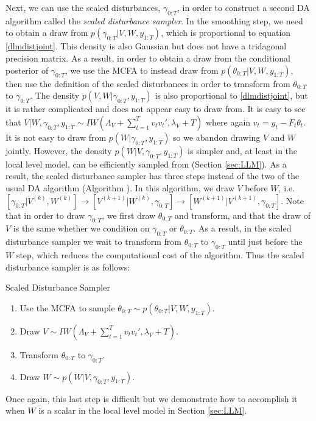 \documentclass{article}
\begin{document}
Next, we can use the scaled disturbances, $\gamma_{0:T}$, in order to construct a second DA algorithm called the {\it scaled disturbance sampler}. In the smoothing step, we need to obtain a draw from $p(\gamma_{0:T}|V,W,y_{1:T})$, which is proportional to equation \eqref{dlmdistjoint}. This density is also Gaussian but does not have a tridagonal precision matrix. As a result, in order to obtain a draw from the conditional posterior of $\gamma_{0:T}$, we use the MCFA to instead draw from $p(\theta_{0:T}|V,W,y_{1:T})$, then use the definition of the scaled disturbances in order to transform from $\theta_{0:T}$ to $\gamma_{0:T}$. The density $p(V,W|\gamma_{0:T},y_{1:T})$ is also proportional to \eqref{dlmdistjoint}, but it is rather complicated and does not appear easy to draw from. It is easy to see that $V|W,\gamma_{0:T},y_{1:T} \sim IW\left(\Lambda_V + \sum_{t=1}^Tv_tv_t',\lambda_V + T\right)$ where again $v_t = y_t - F_t\theta_t$. It is not easy to draw from $p(W|\gamma_{0:T},y_{1:T})$ so we abandon drawing $V$ and $W$ jointly. However, the density $p(W|V,\gamma_{0:T},y_{1:T})$ is simpler and, at least in the local level model, can be efficiently sampled from (Section \ref{sec:LLM}). As a result, the scaled disturbance sampler has three steps instead of the two of the usual DA algorithm (Algorithm ). In this algorithm, we draw $V$ before $W$, i.e. $[\gamma_{0:T}|V^{(k)},W^{(k)}] \to [V^{(k+1)}|W^{(k)},\gamma_{0:T}] \to [W^{(k+1)}|V^{(k+1)},\gamma_{0:T}]$. Note that in order to draw $\gamma_{0:T}$, we first draw $\theta_{0:T}$ and transform, and that the draw of $V$ is the same whether we condition on $\gamma_{0:T}$ or $\theta_{0:T}$. As a result, in the scaled disturbance sampler we wait to transform from $\theta_{0:T}$ to $\gamma_{0:T}$ until just before the $W$ step, which reduces the computational cost of the algorithm. Thus the scaled disturbance sampler is as follows:
\begin{alg*}[Dist]Scaled Disturbance Sampler\label{alg:DLMdist}
\begin{enumerate}
\item Use the MCFA to sample $\theta_{0:T} \sim p(\theta_{0:T}|V,W,y_{1:T})$.
\item Draw $V \sim IW\left(\Lambda_V + \sum_{t=1}^Tv_tv_t',\lambda_V + T\right)$.
\item Transform $\theta_{0:T}$ to $\gamma_{0:T}$.
\item Draw $W \sim p(W|V,\gamma_{0:T},y_{1:T})$.
\end{enumerate}
\end{alg*}
Once again, this last step is difficult but we demonstrate how to accomplish it when $W$ is a scalar in the local level model in Section \ref{sec:LLM}.
\end{document}
